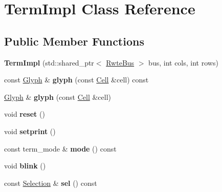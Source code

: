 \hypertarget{classTermImpl}{}\section{Term\+Impl Class Reference}
\label{classTermImpl}
\subsection*{Public Member Functions}
\begin{DoxyCompactItemize}
\item 
\mbox{\label{classTermImpl_ac56b8c6b2c25a595648d84072d5e490c}} 
{\bfseries Term\+Impl} (std\+::shared\+\_\+ptr$<$ \mbox{\hyperlink{classBus}{Rwte\+Bus}} $>$ bus, int cols, int rows)
\item 
\mbox{\label{classTermImpl_a1c930cb2f11f39c98332fc3f1dc38dc1}} 
const \mbox{\hyperlink{structGlyph}{Glyph}} \& {\bfseries glyph} (const \mbox{\hyperlink{structCell}{Cell}} \&cell) const
\item 
\mbox{\label{classTermImpl_af64f6c3c9e9bd780d72d9bc067517659}} 
\mbox{\hyperlink{structGlyph}{Glyph}} \& {\bfseries glyph} (const \mbox{\hyperlink{structCell}{Cell}} \&cell)
\item 
\mbox{\label{classTermImpl_a25e56268d063c2ca87f96ee320f2099f}} 
void {\bfseries reset} ()
\item 
\mbox{\label{classTermImpl_a48e7d1e778d92f6fe72b9cbe9712f0bf}} 
void {\bfseries setprint} ()
\item 
\mbox{\label{classTermImpl_ae4eb97c754aef92d51e5669a989096c9}} 
const term\+\_\+mode \& {\bfseries mode} () const
\item 
\mbox{\label{classTermImpl_a549b3c8da9210755a8b8ba6cc5240a2e}} 
void {\bfseries blink} ()
\item 
\mbox{\label{classTermImpl_a6268d2a37f3866ea4abd31b74ed2fbac}} 
const \mbox{\hyperlink{classSelection}{Selection}} \& {\bfseries sel} () const
\item 
\mbox{\label{classTermImpl_a3b9ec31530f15363bfcb3d07ef6878e0}} 

\end{DoxyCompactItemize}

